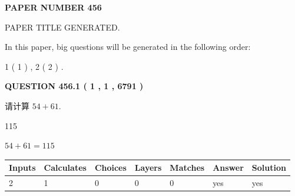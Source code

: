 \documentclass{ctexart}
\begin{document}
   
 {\textbf{ \Large{ PAPER NUMBER  456  }}}
   
   
\vspace{0.2in}
   
   
   
   
   
   
   
   
 \vspace{0.2in}
 
 
 
 
   
   
 PAPER TITLE GENERATED.
   
   
   
\vspace{0.2in}
   
In this paper, big questions will be generated in the following order: 
   
   
   1 ( 1 )
 ,
   2 ( 2 )
 .
  
\vspace{0.2in}
  
{\textbf{\Large{QUESTION
456.1 
 ( 1 , 1 , 6791 )
}}}
  
  
 
请计算 $ %
54 +  %
61 $.
 
 
 
\noindent{}
 
 

115
 
 
\noindent{}
 
 

 
 
 
\noindent{}
 
 

$ %
54 +  %
61=   %
115$
 
 
\noindent{}
 
 

 
   
   
   
   
\noindent\begin{tabular}{|l|l|l|l|l|l|l|}
 \hline
Inputs & Calculates & Choices & Layers & Matches & Answer & Solution \\ \hline
 2  & 
 1  & 
 0
  & 
 0  & 
 0  & 
  yes & 
  yes 
  \\ \hline
 \end{tabular}
   
\end{document}
